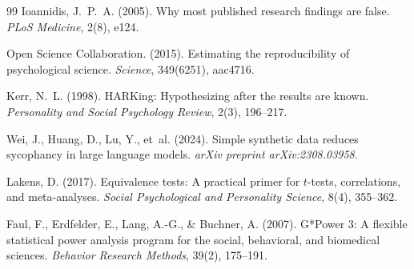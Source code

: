 \documentclass[12pt]{article}
\begin{document}
\begin{thebibliography}{99}
Ioannidis, J.~P.~A. (2005).
\newblock Why most published research findings are false.
\newblock \emph{PLoS Medicine}, 2(8), e124.

{Open Science Collaboration}. (2015).
\newblock Estimating the reproducibility of psychological science.
\newblock \emph{Science}, 349(6251), aac4716.

Kerr, N.~L. (1998).
\newblock HARKing: Hypothesizing after the results are known.
\newblock \emph{Personality and Social Psychology Review}, 2(3), 196--217.

Wei, J., Huang, D., Lu, Y., et~al. (2024).
\newblock Simple synthetic data reduces sycophancy in large language models.
\newblock \emph{arXiv preprint arXiv:2308.03958}.

Lakens, D. (2017).
\newblock Equivalence tests: A practical primer for $t$-tests, correlations, and meta-analyses.
\newblock \emph{Social Psychological and Personality Science}, 8(4), 355--362.

Faul, F., Erdfelder, E., Lang, A.-G., \& Buchner, A. (2007).
\newblock G*Power 3: A flexible statistical power analysis program for the social, behavioral, and biomedical sciences.
\newblock \emph{Behavior Research Methods}, 39(2), 175--191.

\end{thebibliography}
\end{document}
